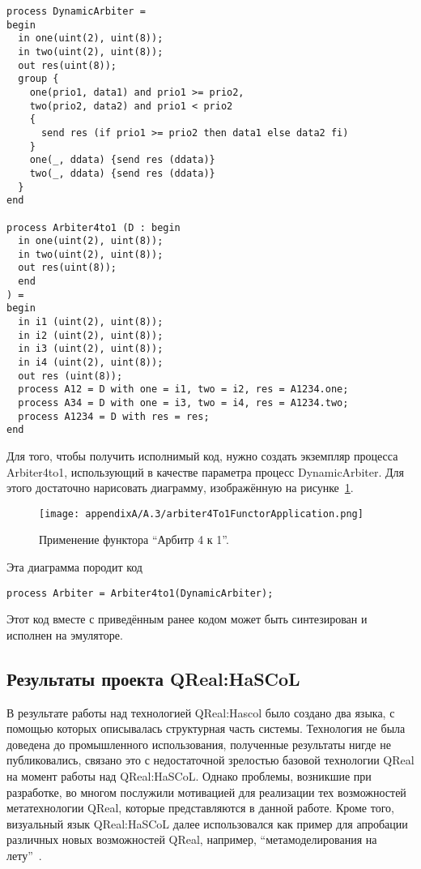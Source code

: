 \vspace{5mm}
\begin{minipage}{\linewidth}
\begin{verbatim}
process DynamicArbiter =
begin
  in one(uint(2), uint(8));
  in two(uint(2), uint(8));
  out res(uint(8));
  group {
    one(prio1, data1) and prio1 >= prio2,
    two(prio2, data2) and prio1 < prio2
    {
      send res (if prio1 >= prio2 then data1 else data2 fi)
    }
    one(_, ddata) {send res (ddata)}
    two(_, ddata) {send res (ddata)}
  }
end

process Arbiter4to1 (D : begin
  in one(uint(2), uint(8));
  in two(uint(2), uint(8));
  out res(uint(8));
  end
) =
begin
  in i1 (uint(2), uint(8));
  in i2 (uint(2), uint(8));
  in i3 (uint(2), uint(8));
  in i4 (uint(2), uint(8));
  out res (uint(8));
  process A12 = D with one = i1, two = i2, res = A1234.one;
  process A34 = D with one = i3, two = i4, res = A1234.two;
  process A1234 = D with res = res;
end
\end{verbatim}
\end{minipage}
\vspace{5mm}

Для того, чтобы получить исполнимый код, нужно создать экземпляр процесса Arbiter4to1, 
использующий в качестве параметра процесс DynamicArbiter. Для этого достаточно нарисовать 
диаграмму, изображённую на рисунке~\ref{image:arbiter4To1FunctorApplication}.

\begin{figure} [ht]
	\begin{center}
		\texttt{[image: appendixA/A.3/arbiter4To1FunctorApplication.png]}
		\caption{Применение функтора "`Арбитр 4 к 1"'.}
		\label{image:arbiter4To1FunctorApplication}
	\end{center}
\end{figure}

Эта диаграмма породит код 

\begin{verbatim}
process Arbiter = Arbiter4to1(DynamicArbiter);
\end{verbatim}

Этот код вместе с приведённым ранее кодом может быть синтезирован и исполнен на эмуляторе.

\subsection{Результаты проекта QReal:HaSCoL}
В результате работы над технологией QReal:Hascol было создано два языка, с помощью 
которых описывалась структурная часть системы. Технология не была доведена до промышленного 
использования, полученные результаты нигде не публиковались, связано это с недостаточной 
зрелостью базовой технологии QReal на момент работы над QReal:HaSCoL. Однако проблемы, 
возникшие при разработке, во многом послужили мотивацией для реализации тех возможностей 
метатехнологии QReal, которые представляются в данной работе. Кроме того, визуальный язык 
QReal:HaSCoL далее использовался как пример для апробации различных новых возможностей 
QReal, например, "`метамоделирования на лету"'~\cite{takun2011diploma, ptakhina2013course}.

